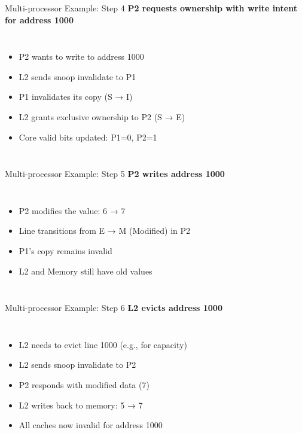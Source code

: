 \documentclass[aspectratio=169,12pt]{beamer}
\begin{document}
\begin{frame}{Multi-processor Example: Step 4}
  \textbf{P2 requests ownership with write intent for address 1000}
  
  \begin{columns}
    \begin{itemize}
      \item P2 wants to write to address 1000
      \item L2 sends snoop invalidate to P1
      \item P1 invalidates its copy (S → I)
      \item L2 grants exclusive ownership to P2 (S → E)
      \item Core valid bits updated: P1=0, P2=1
    \end{itemize}
    
  \end{columns}
\end{frame}

\begin{frame}{Multi-processor Example: Step 5}
  \textbf{P2 writes address 1000}
  \begin{columns}
    \begin{itemize}
      \item P2 modifies the value: 6 → 7
      \item Line transitions from E → M (Modified) in P2
      \item P1's copy remains invalid
      \item L2 and Memory still have old values
    \end{itemize}
    
  \end{columns}
\end{frame}

\begin{frame}{Multi-processor Example: Step 6}
  \textbf{L2 evicts address 1000}
  
  \begin{columns}
    \begin{itemize}
      \item L2 needs to evict line 1000 (e.g., for capacity)
      \item L2 sends snoop invalidate to P2
      \item P2 responds with modified data (7)
      \item L2 writes back to memory: 5 → 7
      \item All caches now invalid for address 1000
    \end{itemize}
    
  \end{columns}
\end{frame}
\end{document}
